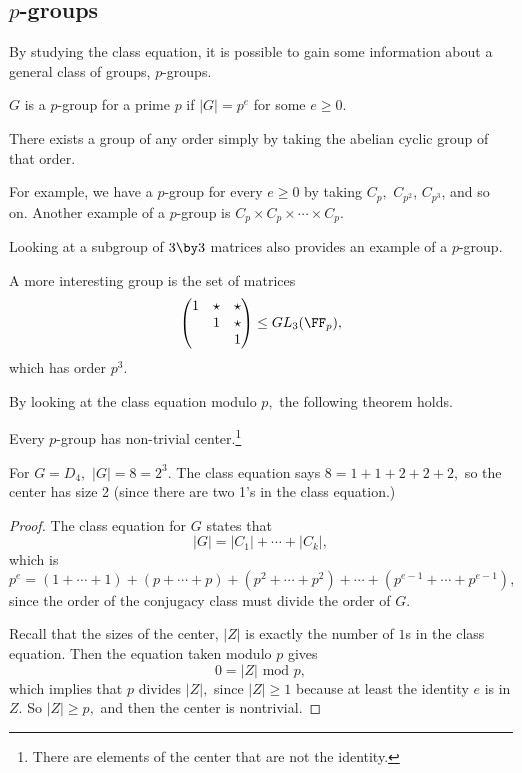 \subsection{\texorpdfstring{$p$}{p}-groups}

By studying the class equation, it is possible to gain some information about a general class of groups, $p$-groups.

\begin{definition}
$G$ is a $p$-group for a prime $p$ if $|G| = p^e$ for some $e \geq 0.$
\end{definition} 

There exists a group of any order simply by taking the abelian cyclic group of that order.
\begin{example}
For example, we have a $p$-group for every $e \geq 0$ by taking $C_p,$ $C_{p^{2}}$, $C_{p^3}$, and so on. Another example of a $p$-group is $C_p \times C_p \times \cdots \times C_p$.
\end{example}

Looking at a subgroup of $3 \by 3$ matrices also provides an example of a $p$-group.
\begin{example}
A more interesting group is the set of matrices
\[\begin{pmatrix}
1 & \star & \star \\
 & 1 & \star \\
 & & 1
\end{pmatrix} \leq GL_3(\FF_p),\]
which has order $p^3.$
\end{example}

By looking at the class equation modulo $p,$ the following theorem holds.

\begin{theorem}
Every $p$-group has non-trivial center.\footnote{There are elements of the center that are not the identity.}
\end{theorem}

\begin{example}
For $G = D_4,$ $|G| = 8 = 2^3.$ The class equation says $8 = 1 + 1 + 2 + 2 + 2,$ so the center has size 2 (since there are two 1's in the class equation.) %
\end{example}

\begin{proof}
The class equation for $G$ states that 
\[
|G| = |C_1| + \cdots + |C_k|,
\]
which is 
\[
p^e = (1 + \cdots + 1) + (p + \cdots + p) + (p^2 + \cdots + p^2) + \cdots + (p^{e-1} + \cdots + p^{e-1}),
\]
since the order of the conjugacy class must divide the order of $G.$

Recall that the sizes of the center, $|Z|$ is exactly the number of $1$s in the class equation. Then the equation taken modulo $p$ gives 
\[
0 = |Z| \text{ mod } p,
\]
which implies that $p$ divides $|Z|,$ since $|Z| \geq 1$ because at least the identity $e$ is in $Z.$ So $|Z| \geq p,$ and then the center is nontrivial.
\end{proof}

